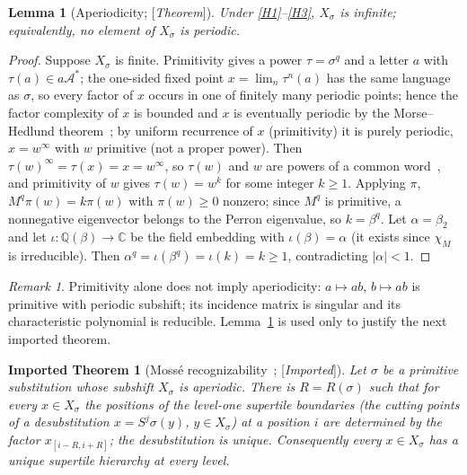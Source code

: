 \documentclass[11pt]{amsart}
\theoremstyle{plain}
\newtheorem{lemma}[theorem]{Lemma}
\newtheorem{importedtheorem}[theorem]{Imported Theorem}
\theoremstyle{definition}
\theoremstyle{remark}
\newtheorem{remark}[theorem]{Remark}
\newcommand{\Q}{\mathbb{Q}}
\newcommand{\C}{\mathbb{C}}
\newcommand{\A}{\mathcal{A}}
\newcommand{\Status}[1]{\textup{[\textit{#1}]}}
\begin{document}
\begin{lemma}[Aperiodicity; \Status{Theorem}]\label{lem:aperiodic}
Under \ref{H1}--\ref{H3}, $X_\sigma$ is infinite; equivalently, no element of $X_\sigma$ is periodic.
\end{lemma}
\begin{proof}
Suppose $X_\sigma$ is finite. Primitivity gives a power $\tau=\sigma^q$ and a letter $a$ with $\tau(a)\in a\A^*$; the one-sided fixed point $x=\lim_n\tau^n(a)$ has the same language as $\sigma$, so every factor of $x$ occurs in one of finitely many periodic points; hence the factor complexity of $x$ is bounded and $x$ is eventually periodic by the Morse--Hedlund theorem~\cite[Thm.~1.3.13]{Lothaire}; by uniform recurrence of $x$ (primitivity) it is purely periodic, $x=w^\infty$ with $w$ primitive (not a proper power). Then $\tau(w)^\infty=\tau(x)=x=w^\infty$, so $\tau(w)$ and $w$ are powers of a common word~\cite[Prop.~1.3.4]{Lothaire}, and primitivity of $w$ gives $\tau(w)=w^k$ for some integer $k\ge1$. Applying $\pi$, $M^q\pi(w)=k\pi(w)$ with $\pi(w)\ge0$ nonzero; since $M^q$ is primitive, a nonnegative eigenvector belongs to the Perron eigenvalue, so $k=\beta^q$. Let $\alpha=\beta_2$ and let $\iota:\Q(\beta)\to\C$ be the field embedding with $\iota(\beta)=\alpha$ (it exists since $\chi_M$ is irreducible). Then $\alpha^q=\iota(\beta^q)=\iota(k)=k\ge1$, contradicting $|\alpha|<1$.
\end{proof}

\begin{remark}
Primitivity alone does not imply aperiodicity: $a\mapsto ab$, $b\mapsto ab$ is primitive with periodic subshift; its incidence matrix is singular and its characteristic polynomial is reducible. Lemma~\ref{lem:aperiodic} is used only to justify the next imported theorem.
\end{remark}

\begin{importedtheorem}[Moss\'e recognizability~\cite{Mosse1,Mosse2}; \Status{Imported}]\label{thm:mosse}
Let $\sigma$ be a primitive substitution whose subshift $X_\sigma$ is aperiodic. There is $R=R(\sigma)$ such that for every $x\in X_\sigma$ the positions of the level-one supertile boundaries (the cutting points of a desubstitution $x=S^{j}\sigma(y)$, $y\in X_\sigma$) at a position $i$ are determined by the factor $x_{[i-R,i+R]}$; the desubstitution is unique. Consequently every $x\in X_\sigma$ has a unique supertile hierarchy at every level.
\end{importedtheorem}
\end{document}

